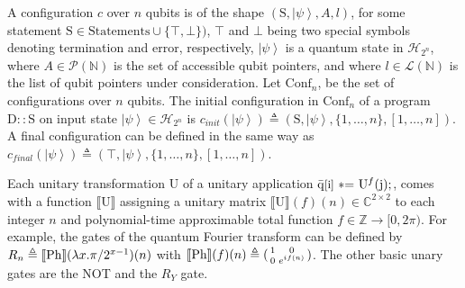 \documentclass[10pt,a4paper]{amsart}
\begin{document}
A configuration $c$ over $n$ qubits is of the shape $(\mathrm{S},\left|\psi\right\rangle,A,l)$, for some statement $\mathrm{S}\in\text{Statements}\cup\{\top,\bot\})$, $\top$ and $\bot$ being two special symbols denoting termination and error, respectively, $\left|\psi\right\rangle$ is a quantum state in $\mathcal{H}_{2^{n}}$, where $A\in\mathcal{P}(\mathbb{N})$ is the set of accessible qubit pointers, and where $l\in\mathcal{L}(\mathbb{N})$ is the list of qubit pointers under consideration. Let $\text{Conf}_{n}$, be the set of configurations over $n$ qubits. The initial configuration in $\text{Conf}_{n}$ of a program $\mathrm{D}::\mathrm{S}$ on input state $\left|\psi\right\rangle\in\mathcal{H}_{2^{n}}$ is $c_{init}(\left|\psi\right\rangle)\triangleq(\mathrm{S},\left|\psi\right\rangle%
,\{1,\dots,n\},[1,\dots,n])$. A final configuration can be defined in the same way as $c_{final}(\left|\psi\right\rangle)\triangleq(\top,\left|\psi\right\rangle,\{1,%
\dots,n\},[1,\dots,n])$.\par
 
 
 
Each unitary transformation $\mathrm{U}$ of a unitary application $\bar{\mathrm{q}}\textnormal{\small[$\mathrm{i}$]}{\ \textnormal{{%
\textasteriskcentered=}}\ }\mathrm{U}^{f}(\mathrm{j});$, comes with a function $\llbracket\mathrm{U}\rrbracket$ assigning a unitary matrix $\llbracket\mathrm{U}\rrbracket(f)(n)\in\mathbb{C}^{2\times 2}$ to each integer $n$ and polynomial-time approximable total function $f\in\mathbb{Z}\to[0,2\pi)$. For example, the gates of the quantum Fourier transform can be defined by $R_{n}\triangleq\llbracket\textnormal{Ph}\rrbracket(\lambda x.\pi/2^{x-1})(n)$ with $\llbracket\textnormal{Ph}\rrbracket(f)(n)\triangleq(\begin{smallmatrix}1&0\\
0&e^{if(n)}\end{smallmatrix})$. The other basic unary gates are the NOT and the $R_{Y}$ gate.\par
 
 
 
\end{document}
